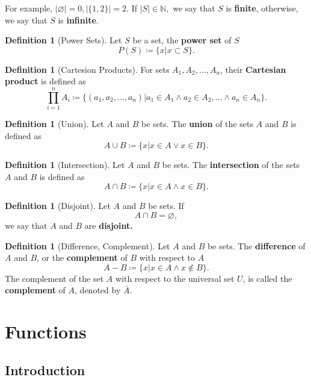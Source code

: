 \documentclass[12pt,a4paper]{report}
\theoremstyle{definition}
\newtheorem{definition}[theorem]{Definition}
\theoremstyle{remark}
\begin{document}
For example, $|\varnothing| = 0, |\{1, 2\}| = 2.$ If $|S| \in \mathbb{N},$ we say that $S$ is \textbf{finite}, otherwise, we say that $S$ is \textbf{infinite}.

\begin{definition}[Power Sets]
    Let $S$ be a set, the \textbf{power set} of $S$
    \[P(S) \coloneqq \{x | x \subset S\}.\]
\end{definition}

\begin{definition}[Cartesion Products]
    For sets $A_1, A_2, \ldots, A_n$, their \textbf{Cartesian product} is defined as
    \[\prod_{i = 1}^n A_i \coloneqq \{(a_1, a_2, \ldots, a_n)| a_1 \in A_1 \land a_2 \in A_2, \ldots \land a_n \in A_n
    \}.\]
\end{definition}

\begin{definition}[Union]
    Let $A$ and $B$ be sets. The \textbf{union} of the sets $A$ and $B$ is defined as
    \[A \cup B \coloneq \{x | x \in A \lor x \in B\}.\]
\end{definition}

\begin{definition}[Intersection]
    Let $A$ and $B$ be sets. The \textbf{intersection} of the sets $A$ and $B$ is defined as
    \[A \cap B \coloneq \{x | x \in A \land x \in B\}.\]
\end{definition}

\begin{definition}[Disjoint]
    Let $A$ and $B$ be sets. If 
    \[A \cap B = \varnothing,\]
    we say that $A$ and $B$ are \textbf{disjoint.}
\end{definition}

\begin{definition}[Difference, Complement]
    Let $A$ and $B$ be sets. The \textbf{difference} of $A$ and $B$, or the \textbf{complement} of $B$ with respect to $A$
    \[A - B \coloneq \{x | x \in A \land x \notin B\}.\]
    The complement of the set $A$ with respect to the universal set $U$, is called the \textbf{complement} of $A$, denoted by $\bar{A}.$
\end{definition}

\chapter{Functions}
\section{Introduction}
\end{document}

